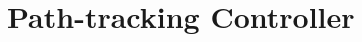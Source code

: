 
\chapter{Path-tracking Controller}
\label{appx:path_track_control}

\ifpdf
    \graphicspath{{B_path_track_control/figures/PNG/}{B_path_track_control/figures/PDF/}{B_path_track_control/figures/}}
\else
    \graphicspath{{B_path_track_control/figures/EPS/}{B_path_track_control/figures/}}
\fi


